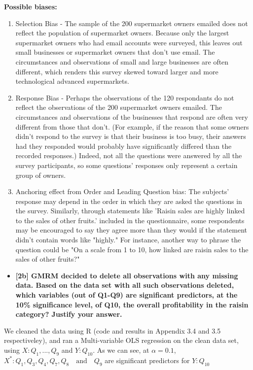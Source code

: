 \documentclass[10pt, oneside,spanish]{article}
\begin{document}
\textbf{Possible biases:}

\begin{enumerate}
\item Selection Bias - The sample of the 200 supermarket owners emailed does not reflect the population of supermarket owners.  Because only the largest supermarket owners who had email accounts were surveyed, this leaves out small businesses or supermarket owners that don't use email.  The circumstances and observations of small and large businesses are often different, which renders this survey skewed toward larger and more technological advanced supermarkets. 

\item Response Bias - Perhaps the observations of the 120 respondants do not reflect the observations of the 200 supermarket owners emailed.  The circumstances and observations of the businesses that respond are often very different from those that don't. (For example, if the reason that some owners didn't respond to the survey is that their business is too busy, their answers had they responded would probably have significantly differed than the recorded responses.)  Indeed, not all the questions were answered by all the survey participants, so some questions' responses only represent a certain group of owners. 

\item Anchoring effect from Order and Leading Question bias: The subjects' response may depend in the order in which they are asked the questions in the survey. Similarly, through statements like  'Raisin sales are highly linked to the sales of other fruits.' included in the questionnaire, some respondents may be encouraged to say they agree more than they would if the statement didn't contain words like "highly." For instance, another way to phrase the question could be "On a scale from 1 to 10, how linked are raisin sales to the sales of other fruits?" 
\end{enumerate}

\begin{itemize}
\item \textbf{[2b]   GMRM decided to delete all observations with any missing data. Based on the data set with all such observations deleted, which variables (out of Q1-Q9) are significant predictors, at the 10\% significance level, of Q10, the overall profitability in the raisin category?  Justify your answer.  }
\end{itemize}

We cleaned the data using R (code and results in Appendix 3.4 and 3.5 respectiveley), and ran a Multi-variable OLS regression on the clean data set, using $X: Q_1, ... , Q_9$ and $Y: Q_{10}$. As we can see, at $\alpha = 0.1 $, $X^{*}: Q_1,Q_3, Q_4, Q_7,Q_8 \quad \textrm{and} \quad Q_9 $ are significant predictors for $Y: Q_{10}$ 
\end{document}
